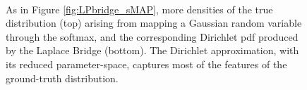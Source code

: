 \begin{figure}[htb]
    \centering
    \scriptsize


    \vspace{-0em}
    \setcounter{subfigure}{0}

     \\

    \caption{As in Figure \ref{fig:LPbridge_sMAP}, more densities of the true distribution (top) arising from mapping a Gaussian random variable through the softmax, and the corresponding Dirichlet pdf produced by the Laplace Bridge (bottom). The Dirichlet approximation, with its reduced parameter-space, captures most of the features of the ground-truth distribution.}
   \label{fig:LPbridge_3samples}
\end{figure}

